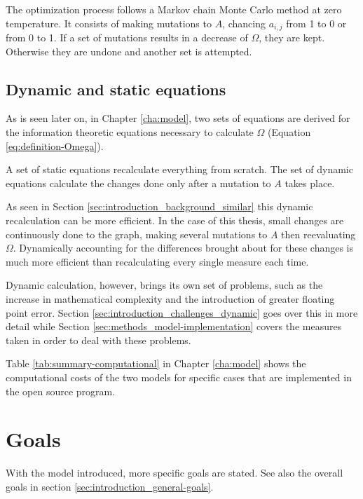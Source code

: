 The optimization process follows a Markov chain Monte Carlo method at zero temperature.
It consists of making mutations to $A$, chancing $a_{i,j}$ from 1 to 0 or from 0 to 1.
If a set of mutations results in a decrease of $\Omega$, they are kept.
Otherwise they are undone and another set is attempted.

\subsection{Dynamic and static equations}
\label{sec:introduction_model_dynamic-static}

As is seen later on, in Chapter \ref{cha:model}, two sets of equations are derived for the information theoretic equations necessary to calculate $\Omega$ (Equation \eqref{eq:definition-Omega}).

A set of static equations recalculate everything from scratch.
The set of dynamic equations calculate the changes done only after a mutation to $A$ takes place.

As seen in Section \ref{sec:introduction_background_similar} this dynamic recalculation can be more efficient.
In the case of this thesis, small changes are continuously done to the graph, making several mutations to $A$ then reevaluating $\Omega$.
Dynamically accounting for the differences brought about for these changes is much more efficient than recalculating every single measure each time.

Dynamic calculation, however, brings its own set of problems, such as the increase in mathematical complexity and the introduction of greater floating point error.
Section \ref{sec:introduction_challenges_dynamic} goes over this in more detail while Section \ref{sec:methods_model-implementation} covers the measures taken in order to deal with these problems.

Table \ref{tab:summary-computational} in Chapter \ref{cha:model} shows the computational costs of the two models for specific cases that are implemented in the \CC{} open source program.

\section{Goals}
\label{sec:introduction_goals}

With the model introduced, more specific goals are stated. See also the overall goals in section \ref{sec:introduction_general-goals}.

